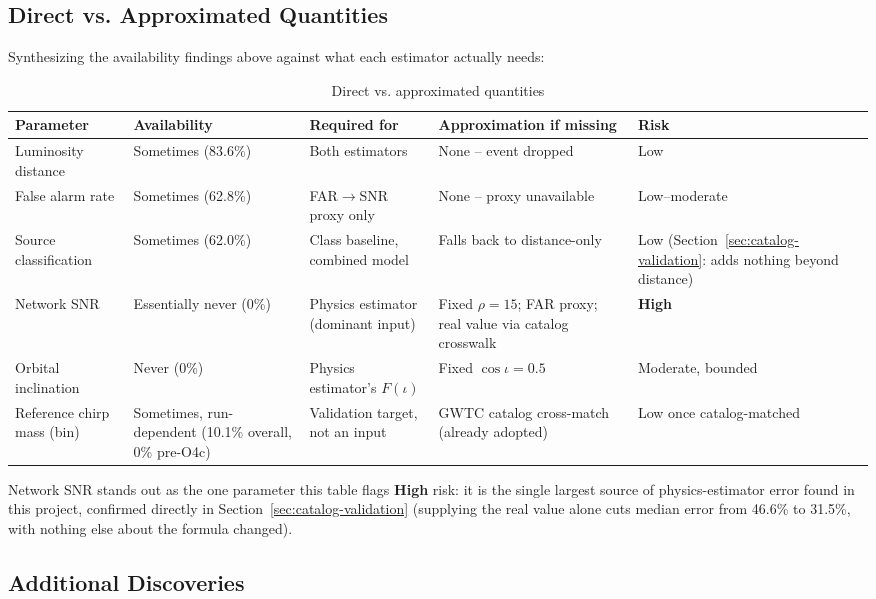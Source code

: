 \subsection{Direct vs. Approximated Quantities}
\label{sec:direct-vs-approximated}

Synthesizing the availability findings above against what each estimator actually needs:

\begin{table}[H]
\centering
\caption{Direct vs. approximated quantities}
\label{tab:direct-vs-approximated}
\small
\begin{tabular}{@{}p{2.3cm}p{1.6cm}p{2.6cm}p{3.6cm}p{1.4cm}@{}}
\toprule
Parameter & Availability & Required for & Approximation if missing & Risk \\
\midrule
Luminosity distance & Sometimes (83.6\%) & Both estimators & None -- event dropped & Low \\
False alarm rate & Sometimes (62.8\%) & FAR$\to$SNR proxy only & None -- proxy unavailable & Low--moderate \\
Source classification & Sometimes (62.0\%) & Class baseline, combined model & Falls back to distance-only & Low (Section~\ref{sec:catalog-validation}: adds nothing beyond distance) \\
Network SNR & Essentially never (0\%) & Physics estimator (dominant input) & Fixed $\rho=15$; FAR proxy; real value via catalog crosswalk & \textbf{High} \\
Orbital inclination & Never (0\%) & Physics estimator's $F(\iota)$ & Fixed $\cos\iota = 0.5$ & Moderate, bounded \\
Reference chirp mass (bin) & Sometimes, run-dependent (10.1\% overall, 0\% pre-O4c) & Validation target, not an input & GWTC catalog cross-match (already adopted) & Low once catalog-matched \\
\bottomrule
\end{tabular}
\end{table}

Network SNR stands out as the one parameter this table flags \textbf{High} risk: it is the single largest source of physics-estimator error found in this project, confirmed directly in Section~\ref{sec:catalog-validation} (supplying the real value alone cuts median error from 46.6\% to 31.5\%, with nothing else about the formula changed).

\subsection{Additional Discoveries}

